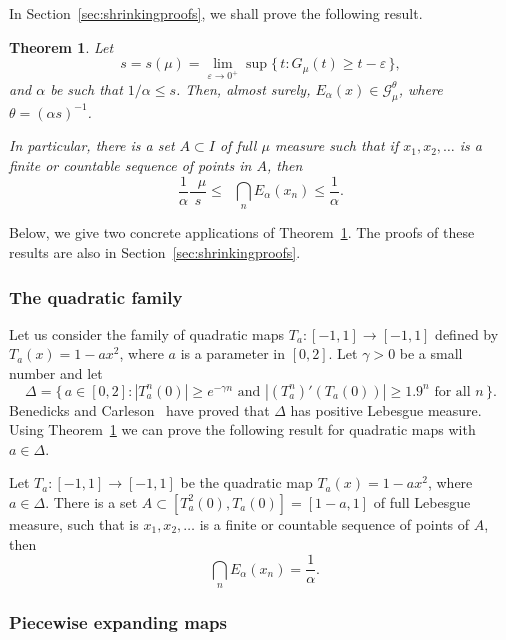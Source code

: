 \documentclass[10pt]{amsart}
\newtheorem{theo}{Theorem}[section]
\theoremstyle{definition}\newtheorem{defi}[theo]{Definition}\newtheorem{rema}[theo]{Remark}\newtheorem{exam}[theo]{Example}\newtheorem{exem}[theo]{Example}\newtheorem{nota}[theo]{Notation}
\DeclareMathOperator{\dimh}{dim_H}
\DeclareMathOperator{\udimh}{\overline{dim}_H}
\begin{document}
In Section~\ref{sec:shrinkingproofs}, we shall prove the following result.

\begin{theo}\label{the:shrinking}
Let
\[
s = s (\mu) = \lim_{\varepsilon \to 0^+} \sup \{\, t : G_\mu (t)
\geq t - \varepsilon \,\},
\]
and $\alpha$ be such that $1/\alpha \leq s$. Then, almost surely, $E_\alpha (x) \in \mathscr{G}_\mu^\theta$, where $\theta = (\alpha s)^{-1}$.

In particular, there is a set $A \subset I$ of full $\mu$ measure such that if $x_1, x_2, \ldots$ is a finite or countable sequence of points in $A$, then
\[
\frac{1}{\alpha} \frac{\udimh \mu}{s} \leq \dimh \bigcap_n E_\alpha (x_n) \leq \frac{1}{\alpha}.
\]
\end{theo}

Below, we give two concrete applications of Theorem~\ref{the:shrinking}. The proofs of these results are also in Section~\ref{sec:shrinkingproofs}.

\subsubsection{The quadratic family} \label{sec:quadratic}

Let us consider the family of quadratic maps $T_a \colon [-1,1] \to [-1,1]$ defined by $T_a (x) = 1 - a x^2$, where $a$ is a parameter in $[0,2]$. Let $\gamma > 0$ be a small number and let
\[
\Delta = \{\, a \in [0, 2] : |T_a^n (0)| \geq e^{-\gamma n} \text{ and } |(T_a^n)' (T_a(0)) | \geq 1.9^n \text{ for all } n \,\}.
\]
Benedicks and Carleson~\cite{benedickscarleson} have proved that $\Delta$ has positive Lebesgue measure. Using Theorem~\ref{the:shrinking} we can prove the following result for quadratic maps with $a \in \Delta$.

\begin{coro}\label{cor:quadratic}
Let $T_a \colon [-1,1] \to [-1,1]$ be the quadratic map $T_a (x) = 1 - a x^2$, where $a \in \Delta$. There is a set $A \subset [T_a^2 (0), T_a (0)] = [1-a,1]$ of full Lebesgue measure, such that is $x_1, x_2, \ldots$ is a finite or countable sequence of points of\/ $A$, then
\[
\dimh \bigcap_n E_\alpha (x_n) = \frac{1}{\alpha}.
\]
\end{coro}


\subsubsection{Piecewise expanding maps} \label{sec:piecewise}
\end{document}
